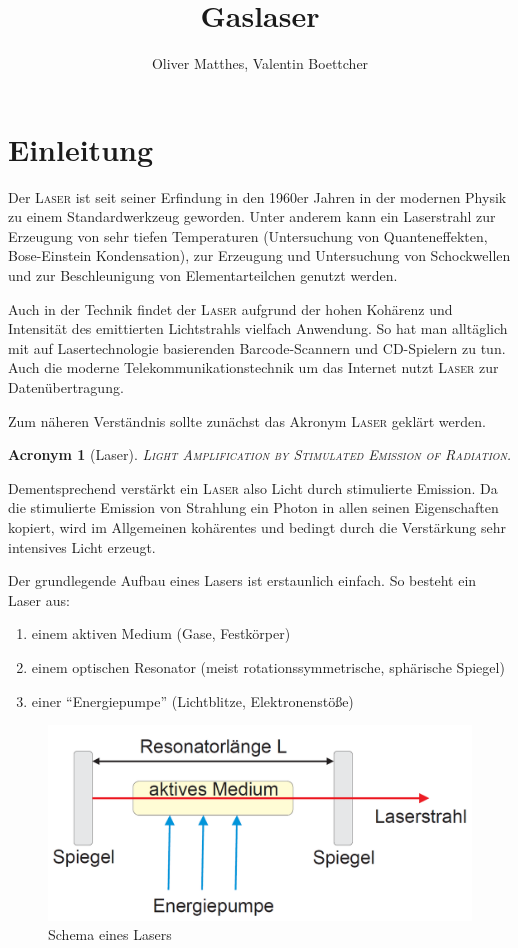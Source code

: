 \documentclass[slug=GL, room=HZDR\ Dresden/Rossendorf\,\ Geb.\ 620/123, supervisor=Tim\ Ziegler]{../../Lab_Report_LaTeX/lab_report}
\title{Gaslaser}
\author{Oliver Matthes, Valentin Boettcher}
\newcommand{\laser}{\textsc{Laser}}
\newtheorem{acro}{Acronym}[section]
\begin{document}
\maketitle

\section{Einleitung}%
\label{sec:intro}
Der \laser{} ist seit seiner Erfindung in den 1960er Jahren in der
modernen Physik zu einem Standardwerkzeug geworden. Unter anderem
kann ein Laserstrahl zur Erzeugung von sehr tiefen Temperaturen
(Untersuchung von Quanteneffekten, Bose-Einstein Kondensation), zur
Erzeugung und Untersuchung von Schockwellen und zur Beschleunigung von
Elementarteilchen genutzt werden.

Auch in der Technik findet der \laser{} aufgrund der hohen Koh\"arenz
und Intensität des emittierten Lichtstrahls vielfach Anwendung. So
hat man allt\"aglich mit auf Lasertechnologie basierenden
Barcode-Scannern und CD-Spielern zu tun. Auch die moderne
Telekommunikationstechnik um das Internet nutzt \laser{} zur
Daten\"ubertragung.

Zum n\"aheren Verst\"andnis sollte zun\"achst das Akronym \laser{}
gekl\"art werden.

\begin{acro}[Laser]
\textsc{Light Amplification by Stimulated Emission of Radiation.}
\end{acro}

Dementsprechend verst\"arkt ein \laser{} also Licht durch stimulierte
Emission. Da die stimulierte Emission von Strahlung ein Photon in
allen seinen Eigenschaften kopiert, wird im Allgemeinen koh\"arentes
und bedingt durch die Verst\"arkung sehr intensives Licht erzeugt.

Der grundlegende Aufbau eines Lasers ist erstaunlich einfach. So
besteht ein Laser aus:

\begin{enumerate}
\item einem aktiven Medium (Gase, Festkörper)
\item einem optischen Resonator (meist rotationssymmetrische, sph\"arische Spiegel)
\item einer ``Energiepumpe'' (Lichtblitze, Elektronenst\"oße)
\end{enumerate}

\begin{figure}[H]\centering
  \includegraphics[width=.5\columnwidth]{schema.png}
  \caption[Aufbau]{Schema eines Lasers}
  \label{fig:aufb}
\end{figure}
\end{document}
